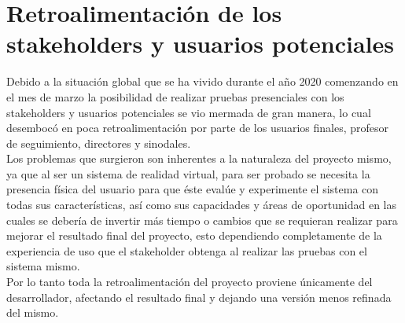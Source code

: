 \section{Retroalimentación de los stakeholders y usuarios potenciales}
Debido a la situación global que se ha vivido durante el año 2020 comenzando en el mes de marzo la posibilidad de realizar pruebas presenciales con los stakeholders y usuarios potenciales se vio mermada de gran manera, lo cual desembocó en poca retroalimentación por parte de los usuarios finales, profesor de seguimiento, directores y sinodales. \\
Los problemas que surgieron son inherentes a la naturaleza del proyecto mismo, ya que al ser un sistema de realidad virtual, para ser probado se necesita la presencia física del usuario para que éste evalúe y experimente el sistema con todas sus características, así como sus capacidades y áreas de oportunidad en las cuales se debería de invertir más tiempo o cambios que se requieran realizar para mejorar el resultado final del proyecto, esto dependiendo completamente de la experiencia  de uso que el stakeholder obtenga al realizar las pruebas con el sistema mismo.\\
Por lo tanto toda la retroalimentación del proyecto proviene únicamente del desarrollador, afectando el resultado final y dejando una versión menos refinada del mismo.\\
